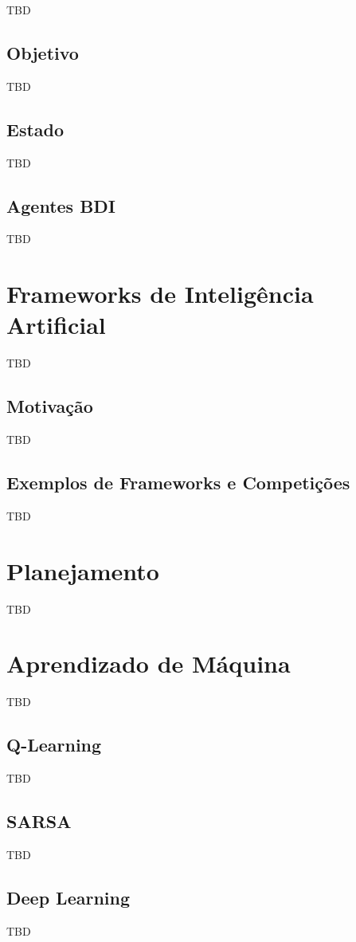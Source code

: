 TBD

\subsection{Objetivo}

TBD

\subsection{Estado}

TBD

\subsection{Agentes BDI}

TBD

\section{Frameworks de Inteligência Artificial}

TBD

\subsection{Motivação}

TBD

\subsection{Exemplos de Frameworks e Competições}

TBD

\section{Planejamento}

TBD

\section{Aprendizado de Máquina}

TBD

\subsection{Q-Learning}

TBD

\subsection{SARSA}

TBD

\subsection{Deep Learning}

TBD
